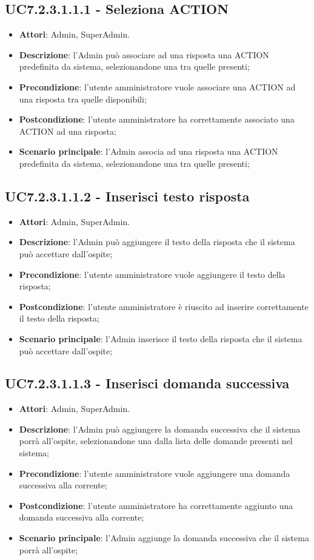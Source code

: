 \documentclass[../AnalisiDeiRequisiti_v4.0.0.tex]{subfiles}
\begin{document}
\subsection{UC7.2.3.1.1.1 - Seleziona ACTION} 
\label{sssec:UC7.2.3.1.1.1} 
\begin{itemize} 
\item \textbf{Attori}: Admin, SuperAdmin.
\item \textbf{Descrizione}: l'Admin può associare ad una risposta una ACTION predefinita da sistema, selezionandone una tra quelle presenti;
\item \textbf{Precondizione}: l'utente amministratore vuole associare una ACTION ad una risposta tra quelle disponibili;
\item \textbf{Postcondizione}: l'utente amministratore ha correttamente associato una ACTION ad una risposta;\item \textbf{Scenario principale}: l'Admin associa ad una risposta una ACTION predefinita da sistema, selezionandone una tra quelle presenti;
\end{itemize} 
\subsection{UC7.2.3.1.1.2 - Inserisci testo risposta} 
\label{sssec:UC7.2.3.1.1.2} 
\begin{itemize} 
\item \textbf{Attori}: Admin, SuperAdmin.
\item \textbf{Descrizione}: l'Admin può aggiungere il testo della risposta che il sistema può accettare dall'ospite;
\item \textbf{Precondizione}: l'utente amministratore vuole aggiungere il testo della risposta;
\item \textbf{Postcondizione}: l'utente amministratore è riuscito ad inserire correttamente il testo della risposta;
\item \textbf{Scenario principale}: l'Admin inserisce il testo della risposta che il sistema può accettare dall'ospite;
\end{itemize} 
\subsection{UC7.2.3.1.1.3 - Inserisci domanda successiva} 
\label{sssec:UC7.2.3.1.1.3} 
\begin{itemize} 
\item \textbf{Attori}: Admin, SuperAdmin.
\item \textbf{Descrizione}: l'Admin può aggiungere la domanda successiva che il sistema porrà all'ospite, selezionandone una dalla lista delle domande presenti nel sistema;
\item \textbf{Precondizione}: l'utente amministratore vuole aggiungere una domanda successiva alla corrente;
\item \textbf{Postcondizione}: l'utente amministratore ha correttamente aggiunto una domanda successiva alla corrente;
\item \textbf{Scenario principale}: l'Admin aggiunge la domanda successiva che il sistema porrà all'ospite;
\end{itemize} 
\newpage
\end{document}
